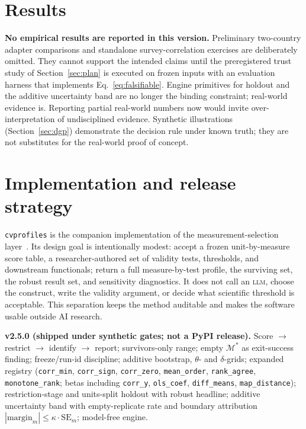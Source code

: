 \documentclass[10pt,letterpaper]{article}
\newcommand{\LLM}{\textsc{llm}}
\newcommand{\cvp}{\texttt{cvprofiles}}
\newcommand{\M}{\ensuremath{\mathcal{M}}}
\begin{document}
\section{Results}
\label{sec:results}
\noindent\colorbox{mist}{\parbox{0.965\textwidth}{\small\vspace{0.35em}
\textbf{No empirical results are reported in this version.}
Preliminary two-country adapter comparisons and standalone survey-correlation exercises are deliberately omitted.
They cannot support the intended claims until the preregistered trust study of Section~\ref{sec:plan} is executed on frozen inputs with an evaluation harness that implements Eq.~\eqref{eq:falsifiable}.
Engine primitives for holdout and the additive uncertainty band are no longer the binding constraint; real-world evidence is.
Reporting partial real-world numbers now would invite over-interpretation of undisciplined evidence.
Synthetic illustrations (Section~\ref{sec:dgp}) demonstrate the decision rule under known truth; they are not substitutes for the real-world proof of concept.
\vspace{0.35em}}}

\section{Implementation and release strategy}
\label{sec:impl}
\cvp{} is the companion implementation of the measurement-selection layer~\cite{cvprofiles}.
Its design goal is intentionally modest: accept a frozen unit-by-measure score table, a researcher-authored set of validity tests, thresholds, and downstream functionals; return a full measure-by-test profile, the surviving set, the robust result set, and sensitivity diagnostics.
It does not call an \LLM{}, choose the construct, write the validity argument, or decide what scientific threshold is acceptable.
This separation keeps the method auditable and makes the software usable outside AI research.

\textbf{v2.5.0 (shipped under synthetic gates; not a PyPI release).}
 Score $\to$ restrict $\to$ identify $\to$ report; survivors-only range; empty $\M^*$ as exit-success finding; freeze/run-id discipline; additive bootstrap, $\theta$- and $\delta$-grids; expanded registry (\texttt{corr\_min}, \texttt{corr\_sign}, \texttt{corr\_zero}, \texttt{mean\_order}, \texttt{rank\_agree}, \texttt{monotone\_rank}; betas including \texttt{corr\_y}, \texttt{ols\_coef}, \texttt{diff\_means}, \texttt{map\_distance}); restriction-stage and units-split holdout with robust headline; additive uncertainty band with empty-replicate rate and boundary attribution $|\mathrm{margin}_m|\le\kappa\cdot\mathrm{SE}_m$; model-free engine.
\end{document}

